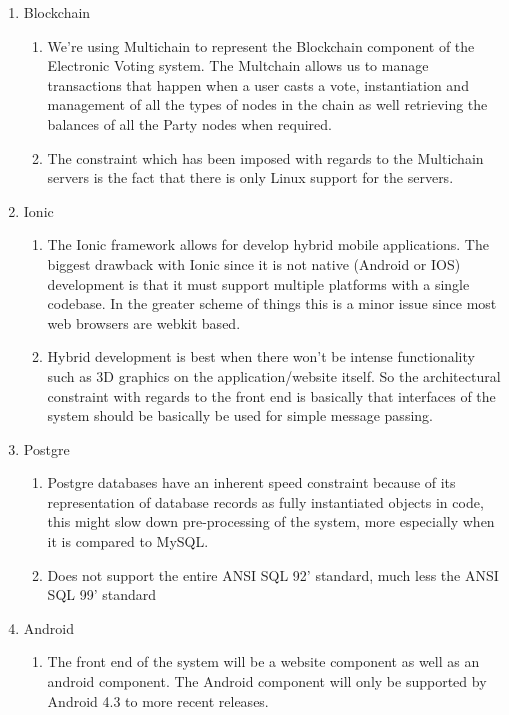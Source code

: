 \begin{enumerate}
	\item Blockchain
	\begin{enumerate}
		\item We're using Multichain to represent the Blockchain component of the Electronic Voting system. The Multchain allows us to manage transactions that happen when a user casts a vote, instantiation and management of all the types of nodes in the chain as well retrieving the balances of all the Party nodes when required. 
		
		\item The constraint which has been imposed with regards to the Multichain servers is the fact that there is only Linux support for the servers. 
		
	\end{enumerate}
	
	\item Ionic
	\begin{enumerate}
		\item The Ionic framework allows for develop hybrid mobile applications. The biggest drawback with Ionic since it is not native (Android or IOS) development is that it must support multiple platforms with a single codebase. In the greater scheme of things this is a minor issue since most web browsers are webkit based.
		
		\item Hybrid development is best when there won’t be intense functionality such as 3D graphics on the application/website itself. So the architectural constraint with regards to the front end is basically that interfaces of the system should be basically be used for simple message passing.  
	\end{enumerate}
	
	\item Postgre
	\begin{enumerate}
		\item Postgre databases have an inherent speed constraint because of its representation of database records as fully instantiated objects in code, this might slow down pre-processing of the system, more especially when it is compared to MySQL. 
		
		\item Does not support the entire ANSI SQL 92' standard, much less the ANSI SQL 99' standard
	\end{enumerate}
	
	\item Android 
	\begin{enumerate}
		\item The front end of the system will be a website component as well as an android component. The Android component will only be supported by Android 4.3 to more recent releases. 
	\end{enumerate}
\end{enumerate}
